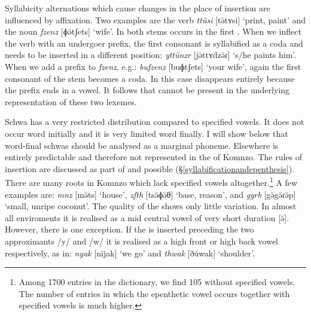 Syllabicity alternations which cause changes in the place of  insertion are influenced by affixation. Two examples are the verb \emph{ttüsi} [tə̆tʏsi] `print, paint' and the noun \emph{fzenz} [ɸə̆tʃets] `wife'. In both stems  occurs in the first . When we inflect the verb with an undergoer prefix, the first consonant is syllabified as a coda and  needs to be inserted in a different position: \emph{yttünzr} [jə̆ttʏdzə̆ɾ] `s/he paints him'. When we add a  prefix to \emph{fzenz}, e.g.: \emph{bufzenz} [buɸtʃets] `your wife', again the first consonant of the stem becomes a coda. In this case  disappears entirely because the  prefix ends in a vowel. It follows that  cannot be present in the underlying representation of these two lexemes.%

Schwa has a very restricted distribution compared to specified vowels. It does not occur word initially and it is very limited word finally. I will show below that word-final schwas should be analysed as a marginal phoneme. Elsewhere  is entirely predictable and therefore not represented in the  of Komnzo. The rules of  insertion are discussed as part of  and possible  (\S{}\ref{syllabificationandepenthesis}). There are many roots in Komnzo which lack specified vowels altogether.\footnote{Among 1700 entries in the dictionary, we find 105 without specified vowels. The number of entries in which the epenthetic vowel occurs together with specified vowels is much higher.} A few examples are: \emph{mnz} [mə̆ts] `house', \emph{zfth} [tsə̆ɸə̆θ] `base, reason', and \emph{ggrb} [gə̆gə̆ɾə̆p] `small, unripe coconut'. The quality of the  shows only little variation. In almost all enviroments it is realised as a mid central vowel of very short duration [ə̆]. However, there is one exception. If the  is inserted preceding the two approximants /y/ and /w/ it is realised as a high front or high back vowel respectively, as in: \emph{nyak} [nĭjak] `we go' and \emph{thwak} [ðŭwak] `shoulder'.%

